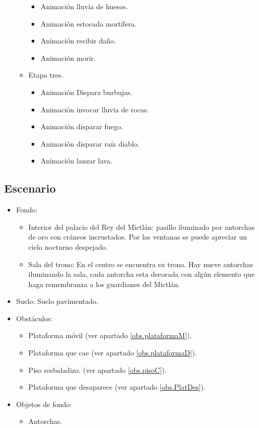 \begin{itemize}
\begin{itemize}
				\begin{itemize}
					\item Animación lluvia de huesos.
					\item Animación estocada mortífera.
					\item Animación recibir daño.
					\item Animación morir.
				\end{itemize}
			\item Etapa tres.
				\begin{itemize}
					\item Animación Dispara burbujas.
					\item Animación invocar lluvia de rocas.
					\item Animación disparar fuego.
					\item Animación disparar raíz diablo.
					\item Animación lanzar lava.
				\end{itemize}				 
		\end{itemize}
	\end{itemize}
	\subsection{Escenario}
\begin{itemize} 
	\item Fondo: 
	\begin{itemize}
		\item Interior del palacio del Rey del Mictlán: pasillo iluminado por antorchas de oro con cráneos incrustados. Por las ventanas se puede apreciar un cielo nocturno despejado.
		\item Sala del trono: En el centro se encuentra su trono. Hay nueve antorchas iluminando la sala, cada antorcha esta decorada con algún elemento que haga remembranza a los guardianes del Mictlán. 
	\end{itemize}
	\item Suelo: Suelo pavimentado.
	\item Obstáculos:
	\begin{itemize}
			\item Plataforma móvil (ver apartado \ref{obs.plataformaM}).
			\item Plataforma que cae (ver apartado \ref{obs.plataformaD}).
			\item Piso resbaladizo. (ver apartado \ref{obs.pisoC}).
			\item Plataforma que desaparece (ver apartado \ref{obs.PlatDes}).
		\end{itemize}
	\item Objetos de fondo: 
		\begin{itemize}
			\item Antorchas.
		\end{itemize}
\end{itemize}	

